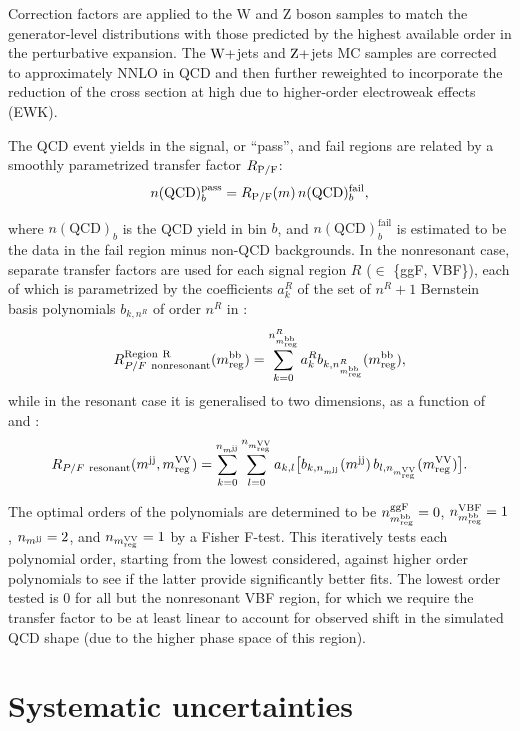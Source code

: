 Correction factors are applied to the W and Z boson samples to match the generator-level \pt distributions with those predicted by the highest available order in the perturbative expansion.
The $\textrm{W}+$jets and $\textrm{Z}+$jets MC samples are corrected to approximately NNLO in QCD and then further reweighted to incorporate the reduction of the cross section at high \pt due to higher-order electroweak effects (EWK).

The QCD event yields in the signal, or ``pass'', and fail regions are related by a smoothly parametrized transfer factor $R_\mathrm{P/F}$:
\begin{equation}
n(\mathrm{QCD})^\mathrm{pass}_b = R_\mathrm{P/F}(m)\, n(\mathrm{QCD})^\mathrm{fail}_b,
\end{equation}

where $n(\mathrm{QCD})_b$ is the QCD yield in bin $b$, and $n(\mathrm{QCD})^\mathrm{fail}_b$ is estimated to be the data in the fail region minus non-QCD backgrounds.
In the nonresonant case, separate transfer factors are used for each signal region $R$ ($\in$ \{ggF, VBF\}), each of which is parametrized by the coefficients $a^R_k$ of the set of $n^R + 1$ Bernstein basis polynomials $b_{k, n^R}$ of order $n^R$ in \mregbb:
\begin{equation}
R^\mathrm{Region\ R}_{P/F\ \textrm{nonresonant}}(\mregbb) = \sum^{n^R_\mregbb}_{k=0} a^R_k b_{k, n^R_\mregbb}(\mregbb),
\end{equation}
while in the resonant case it is generalised to two dimensions, as a function of \mjj and \mregvv:
\begin{equation}
R_{P/F\ \textrm{resonant}}({m^\mathrm{jj}}, {m_\mathrm{reg}^\mathrm{VV}}) = \sum^{n_{m^\mathrm{jj}}}_{k=0} \sum^{n_{m_\mathrm{reg}^\mathrm{VV}}}_{l=0} a_{k,l} \big[ b_{k, n_{m^\mathrm{jj}}}({m^\mathrm{jj}})\, b_{l, n_{m_\mathrm{reg}^\mathrm{VV}}}({m_\mathrm{reg}^\mathrm{VV}})\big].
\end{equation}

The optimal orders of the polynomials are determined to be $n^\mathrm{ggF}_{m_\mathrm{reg}^\mathrm{bb}} = 0$, $n^\mathrm{VBF}_{m_\mathrm{reg}^\mathrm{bb}} = 1$, $n_{m^\mathrm{jj}} = 2$, and $n_{m_\mathrm{reg}^\mathrm{VV}} = 1$ by a Fisher F-test.
This iteratively tests each polynomial order, starting from the lowest considered, against higher order polynomials to see if the latter provide significantly better fits.
The lowest order tested is 0 for all but the nonresonant VBF region, for which we require the transfer factor to be at least linear to account for observed shift in the simulated QCD \mregbb shape (due to the higher \mHH phase space of this region).

\section{Systematic uncertainties}
\label{sec:05_hh_systematics}

